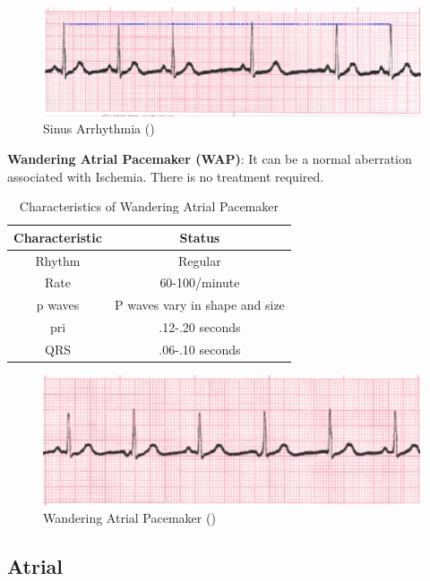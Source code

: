  \begin{figure}[H]
\centering
\includegraphics[scale=0.9]{img/SA.png}
\caption{Sinus Arrhythmia (\cite{arryth_types})}
\label{fig:SA}
\end{figure}

\textbf{Wandering Atrial Pacemaker (WAP)}: It can be a normal aberration associated with Ischemia. There is no treatment required.

\begin{table}[H]
\begin{center}
\begin{tabular}{||c || c||}
 \hline
\textbf{Characteristic} & \textbf{Status} \\ [0.4ex] 
 \hline\hline
 Rhythm & Regular \\
\hline
Rate & 60-100/minute \\
\hline
p waves & P waves vary in shape and size \\
\hline
pri & .12-.20 seconds \\
\hline
QRS & .06-.10 seconds \\
\hline\hline
\end{tabular}
\end{center}
\caption{Characteristics of Wandering Atrial Pacemaker}
\label{table:WAP_characteristics}
\end{table}


 \begin{figure}[H]
\centering
\includegraphics[scale=0.9]{img/WAP.png}
\caption{Wandering Atrial Pacemaker (\cite{arryth_types})}
\label{fig:WAP}
\end{figure}

\subsection{Atrial}

